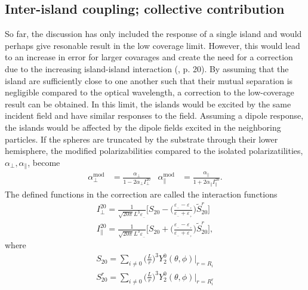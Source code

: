 \subsection{Inter-island coupling; collective contribution}
So far, the discussion has only included the response of a single island and would perhaps 
give resonable result in the low coverage limit. However, this would lead to 
an increase in error for larger covarages and create the need for a correction
due to the increasing island-island interaction (\cite{Lie2010}, p. 20). 
By assuming that the island are sufficiently close to one another such that their mutual separation is 
negligible compared to the optical wavelength, a correction to the low-coverage result can be obtained. 
In this limit, the islands would be excited by the same incident field and have similar responses
to the field. Assuming a dipole response, the islands would be affected by the dipole
fields excited in the neighboring particles. If the spheres are truncated by the substrate through their
lower hemisphere, the modified polarizabilities compared to the isolated polarizatilities, $\alpha_{\perp},
\alpha_{\parallel}$, become
\begin{align}
   \alpha^{\text{mod}}_{\perp} &= \frac{\alpha_{\perp}}{ 1 - 2 \alpha_{\perp} I_{\perp}^{20} }
   &\alpha^{\text{mod}}_{\parallel} &= \frac{\alpha_{\parallel}}{ 1 + 2 \alpha_{\parallel} I_{\parallel}^{20}}.
\end{align}
%
The defined functions in the correction are called the interaction functions
%
\begin{subequations}
\label{couplingPolarizability}
\begin{align}
I_{\perp}^{20} = \frac{1}{\sqrt{20\pi} L^3 \varepsilon_{_-} } 
   \Bigg[
   S_{20} - \Bigg( \frac{\varepsilon_{_-}-\varepsilon_{_+}}{\varepsilon_{_-}+\varepsilon_{_+}} \Bigg) 
   \tilde{S}_{20}^r
   \Bigg]
   \label{couplingPolarizability1}\\
%
   I_{\parallel}^{20} = \frac{1}{\sqrt{20\pi} L^3 \varepsilon_{_-} } 
   \Bigg[
   S_{20} + \Bigg( \frac{\varepsilon_{_-}-\varepsilon_{_+}}{\varepsilon_{_-}+\varepsilon_{_+}} \Bigg) 
   \tilde{S}_{20}^r
   \Bigg],
   \label{couplingPolarizability2}
\end{align}
\end{subequations}
%
where
%
\begin{subequations}
\label{latticeSums}
\begin{align}
   S_{20} = \sum\limits_{i \neq 0} \Bigg( \frac{L}{r}\Bigg)^3 Y_2^0 (\theta,\phi) \Biggr|_{r=R_i}
   \label{latticeSums1} \\
%
   S_{20}^r = \sum\limits_{i \neq 0} \Bigg( \frac{L}{r}\Bigg)^3 Y_2^0 (\theta,\phi) \Biggr|_{r=R_i^r}
   \label{latticeSums2}
\end{align}
\end{subequations}
